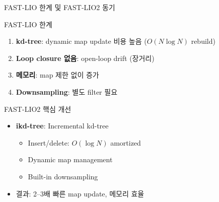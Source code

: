 \begin{frame}{FAST-LIO 한계 및 FAST-LIO2 동기}
  \begin{alertblock}{FAST-LIO 한계}
    \begin{enumerate}
      \item \textbf{kd-tree}: dynamic map update 비용 높음 ($O(N\log N)$ rebuild)
      \item \textbf{Loop closure 없음}: open-loop drift (장거리)
      \item \textbf{메모리}: map 제한 없이 증가
      \item \textbf{Downsampling}: 별도 filter 필요
    \end{enumerate}
  \end{alertblock}
  \pause
  \begin{block}{FAST-LIO2 핵심 개선}
    \begin{itemize}
      \item \textbf{ikd-tree}: Incremental kd-tree
        \begin{itemize}
          \item Insert/delete: $O(\log N)$ amortized
          \item Dynamic map management
          \item Built-in downsampling
        \end{itemize}
      \item 결과: 2--3배 빠른 map update, 메모리 효율
    \end{itemize}
  \end{block}
\end{frame}

